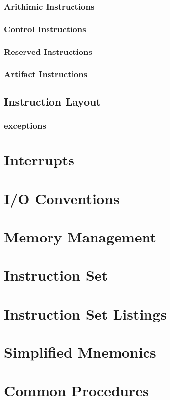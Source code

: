 \documentclass[twoside,a4paper]{memoir}
\begin{document}
\subsection{Arithimic Instructions}
\subsection{Control Instructions}
\subsection{Reserved Instructions}
\subsection{Artifact Instructions}
\section{Instruction Layout}
\subsection{exceptions}

\chapter{Interrupts}

\chapter{I/O Conventions}

\chapter{Memory Management}

\chapter{Instruction Set}

\appendix
\chapter{Instruction Set Listings}

\chapter{Simplified Mnemonics}

\chapter{Common Procedures}
\end{document}
